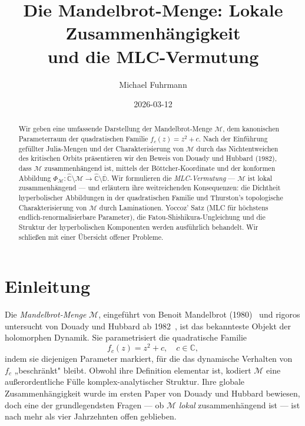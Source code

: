 \documentclass[12pt,a4paper]{amsart}
\theoremstyle{definition}
\theoremstyle{remark}
\begin{document}
\begin{abstract}
Wir geben eine umfassende Darstellung der Mandelbrot-Menge $\mathcal{M}$,
dem kanonischen Parameterraum der quadratischen Familie $f_c(z) = z^2 + c$.
Nach der Einführung gefüllter Julia-Mengen und der Charakterisierung von
$\mathcal{M}$ durch das Nichtentweichen des kritischen Orbits präsentieren
wir den Beweis von Douady und Hubbard (1982), dass $\mathcal{M}$ zusammenhängend
ist, mittels der Böttcher-Koordinate und der konformen Abbildung
$\Phi_{\mathcal{M}} \colon \widehat{\mathbb{C}} \setminus \mathcal{M}
\to \widehat{\mathbb{C}} \setminus \overline{\mathbb{D}}$.
Wir formulieren die \emph{MLC-Vermutung} — $\mathcal{M}$ ist lokal
zusammenhängend — und erläutern ihre weitreichenden Konsequenzen:
die Dichtheit hyperbolischer Abbildungen in der quadratischen Familie
und Thurston's topologische Charakterisierung von $\mathcal{M}$
durch Laminationen. Yoccoz' Satz (MLC für höchstens endlich-renormalisierbare
Parameter), die Fatou-Shishikura-Ungleichung und die Struktur der
hyperbolischen Komponenten werden ausführlich behandelt.
Wir schließen mit einer Übersicht offener Probleme.
\end{abstract}

\title{Die Mandelbrot-Menge: Lokale Zusammenhängigkeit\\
und die MLC-Vermutung}
\author{Michael Fuhrmann}
\address{Specialist Mathematics Project, Build 165}
\date{2026-03-12}

\maketitle

\section{Einleitung}

Die \emph{Mandelbrot-Menge} $\mathcal{M}$, eingeführt von Benoit Mandelbrot
(1980)~\cite{Mandelbrot1980} und rigoros untersucht von Douady und Hubbard
ab 1982~\cite{DouadyHubbard1982}, ist das bekannteste Objekt der holomorphen
Dynamik. Sie parametrisiert die quadratische Familie
\[
    f_c(z) = z^2 + c, \quad c \in \mathbb{C},
\]
indem sie diejenigen Parameter markiert, für die das dynamische Verhalten
von $f_c$ „beschränkt" bleibt. Obwohl ihre Definition elementar ist,
kodiert $\mathcal{M}$ eine außerordentliche Fülle komplex-analytischer
Struktur. Ihre globale Zusammenhängigkeit wurde im ersten Paper von Douady
und Hubbard bewiesen, doch eine der grundlegendsten Fragen — ob $\mathcal{M}$
\emph{lokal} zusammenhängend ist — ist nach mehr als vier Jahrzehnten
offen geblieben.
\end{document}
